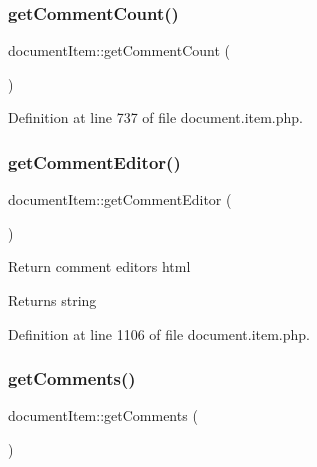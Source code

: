\hypertarget{classdocumentItem_a9ed429fc56e6f95ef097645c772aa4e5}{}\label{classdocumentItem_a9ed429fc56e6f95ef097645c772aa4e5} 
\subsubsection{\texorpdfstring{get\+Comment\+Count()}{getCommentCount()}}
{\footnotesize\ttfamily document\+Item\+::get\+Comment\+Count (\begin{DoxyParamCaption}{ }\end{DoxyParamCaption})}



Definition at line 737 of file document.\+item.\+php.

\hypertarget{classdocumentItem_a59ef94b52cf1a250aa4f29990e8d376d}{}\label{classdocumentItem_a59ef94b52cf1a250aa4f29990e8d376d} 
\subsubsection{\texorpdfstring{get\+Comment\+Editor()}{getCommentEditor()}}
{\footnotesize\ttfamily document\+Item\+::get\+Comment\+Editor (\begin{DoxyParamCaption}{ }\end{DoxyParamCaption})}

Return comment editor\textquotesingle{}s html \begin{DoxyReturn}{Returns}
string 
\end{DoxyReturn}


Definition at line 1106 of file document.\+item.\+php.

\hypertarget{classdocumentItem_ad85b3da641f8bd477963d7290383e6be}{}\label{classdocumentItem_ad85b3da641f8bd477963d7290383e6be} 
\subsubsection{\texorpdfstring{get\+Comments()}{getComments()}}
{\footnotesize\ttfamily document\+Item\+::get\+Comments (\begin{DoxyParamCaption}{ }\end{DoxyParamCaption})}



